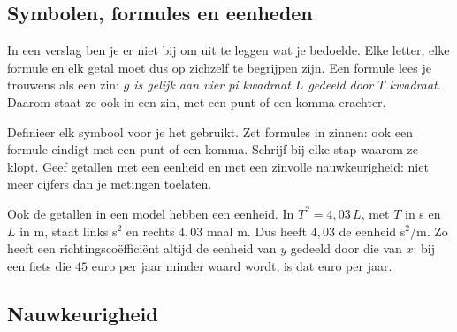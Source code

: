 \subsection{Symbolen, formules en eenheden}

In een verslag ben je er niet bij om uit te leggen wat je bedoelde. Elke letter, elke formule en elk getal moet dus op zichzelf te begrijpen zijn. Een formule lees je trouwens als een zin: \textit{$g$ is gelijk aan vier pi kwadraat $L$ gedeeld door $T$ kwadraat.} Daarom staat ze ook in een zin, met een punt of een komma erachter.


\begin{werkwijze}
Definieer elk symbool voor je het gebruikt. Zet formules in zinnen: ook een formule eindigt met een punt of een komma. Schrijf bij elke stap waarom ze klopt. Geef getallen met een eenheid en met een zinvolle nauwkeurigheid: niet meer cijfers dan je metingen toelaten.
\end{werkwijze}

Ook de getallen in een model hebben een eenheid. In $T^2 = 4{,}03\,L$, met $T$ in s en $L$ in m, staat links s$^2$ en rechts $4{,}03$ maal m. Dus heeft $4{,}03$ de eenheid s$^2$/m. Zo heeft een richtingscoëfficiënt altijd de eenheid van $y$ gedeeld door die van $x$: bij een fiets die $45$ euro per jaar minder waard wordt, is dat euro per jaar.

\begin{oefeningen}
\end{oefeningen}

\subsection{Nauwkeurigheid}

